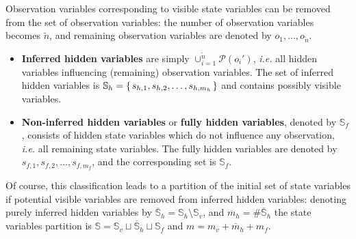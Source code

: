 Observation variables corresponding to visible state variables can be removed 
from the set of observation variables: the number of observation variables becomes 
$\tilde{n}$, and remaining observation variables are denoted by $o_1,\ldots,o_{\tilde{n}}$.
\begin{itemize}
\item \textbf{Inferred hidden variables} are simply $\cup_{i=1}^{\tilde{n}} \mathcal{P}(o_i')$, 
\textit{i.e.} all hidden variables influencing (remaining) observation variables. The set of
inferred hidden variables is $\mathbb{S}_h = \left\{ \left. s_{h,1},s_{h,2}, \ldots, s_{h,m_h} \right. \right\}$ and 
contains possibly visible variables.
\item \textbf{Non-inferred hidden variables} or \textbf{fully hidden variables}, denoted by $\mathbb{S}_f$, 
consists of hidden state variables which do not influence any observation, 
\textit{i.e.} all remaining state variables. The fully hidden variables are denoted by 
$s_{f,1},s_{f,2}, \ldots, s_{f,m_f}$, and the corresponding set is $\mathbb{S}_{f}$.
\end{itemize}
Of course, this classification leads to a partition of the initial set of state variables 
if potential visible variables are removed from
inferred hidden variables: denoting purely inferred hidden variables by $\overline{\mathbb{S}}_h = \mathbb{S}_h \setminus \mathbb{S}_v$, 
and $\overline{m}_h = \# \overline{\mathbb{S}}_h$ the state variables partition is 
$\mathbb{S} = \mathbb{S}_v \sqcup \overline{\mathbb{S}}_h \sqcup \mathbb{S}_f$ and $m = m_v + \overline{m}_h + m_f$.

